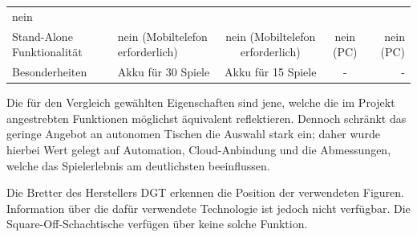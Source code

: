 \begin{longtable}[]{@{}llccr@{}}
\begin{minipage}[t]{0.13\columnwidth}
nein\strut
\end{minipage}\tabularnewline
\begin{minipage}[t]{0.19\columnwidth}\raggedright
Stand-Alone Funktionalität\strut
\end{minipage} & \begin{minipage}[t]{0.19\columnwidth}\raggedright
nein (Mobiltelefon erforderlich)\strut
\end{minipage} & \begin{minipage}[t]{0.20\columnwidth}\centering
nein (Mobiltelefon erforderlich)\strut
\end{minipage} & \begin{minipage}[t]{0.15\columnwidth}\centering
nein (PC)\strut
\end{minipage} & \begin{minipage}[t]{0.13\columnwidth}\raggedleft
nein (PC)\strut
\end{minipage}\tabularnewline
\begin{minipage}[t]{0.19\columnwidth}\raggedright
Besonderheiten\strut
\end{minipage} & \begin{minipage}[t]{0.19\columnwidth}\raggedright
Akku für 30 Spiele\strut
\end{minipage} & \begin{minipage}[t]{0.20\columnwidth}\centering
Akku für 15 Spiele\strut
\end{minipage} & \begin{minipage}[t]{0.15\columnwidth}\centering
-\strut
\end{minipage} & \begin{minipage}[t]{0.13\columnwidth}\raggedleft
-\strut
\end{minipage}\tabularnewline
\bottomrule
\end{longtable}

\pagebreak

Die für den Vergleich gewählten Eigenschaften sind jene, welche die im
Projekt angestrebten Funktionen möglichst äquivalent reflektieren.
Dennoch schränkt das geringe Angebot an autonomen Tischen die Auswahl
stark ein; daher wurde hierbei Wert gelegt auf Automation,
Cloud-Anbindung und die Abmessungen, welche das Spielerlebnis am
deutlichsten beeinflussen.

Die Bretter des Herstellers DGT erkennen die Position der verwendeten
Figuren. Information über die dafür verwendete Technologie ist jedoch
nicht verfügbar. Die Square-Off-Schachtische verfügen über keine solche
Funktion.

